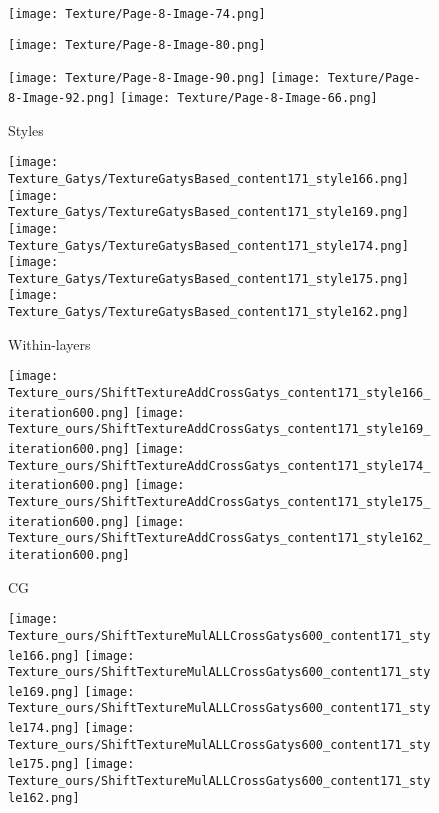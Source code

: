 \documentclass[runningheads]{llncs}
\begin{document}
\begin{figure*}[!htbp]
\centering
\small 
\begin{subfigure}[t]{0.15\textwidth}
	
	\texttt{[image: Texture/Page-8-Image-74.png]}

	\texttt{[image: Texture/Page-8-Image-80.png]}

	\texttt{[image: Texture/Page-8-Image-90.png]}
	\texttt{[image: Texture/Page-8-Image-92.png]}
    \texttt{[image: Texture/Page-8-Image-66.png]}

    \caption{Styles}
\end{subfigure}
\begin{subfigure}[t]{0.15\textwidth}
	
	\texttt{[image: Texture\_Gatys/TextureGatysBased\_content171\_style166.png]}
	\texttt{[image: Texture\_Gatys/TextureGatysBased\_content171\_style169.png]}
	\texttt{[image: Texture\_Gatys/TextureGatysBased\_content171\_style174.png]}
	\texttt{[image: Texture\_Gatys/TextureGatysBased\_content171\_style175.png]}  
    \texttt{[image: Texture\_Gatys/TextureGatysBased\_content171\_style162.png]}

    \caption{Within-layers}
\end{subfigure}

\begin{subfigure}[t]{0.15\textwidth}
	
	\texttt{[image: Texture\_ours/ShiftTextureAddCrossGatys\_content171\_style166\_iteration600.png]}
	\texttt{[image: Texture\_ours/ShiftTextureAddCrossGatys\_content171\_style169\_iteration600.png]}
	\texttt{[image: Texture\_ours/ShiftTextureAddCrossGatys\_content171\_style174\_iteration600.png]}
	\texttt{[image: Texture\_ours/ShiftTextureAddCrossGatys\_content171\_style175\_iteration600.png]}
    \texttt{[image: Texture\_ours/ShiftTextureAddCrossGatys\_content171\_style162\_iteration600.png]}
    \caption{CG}
\end{subfigure}
\begin{subfigure}[t]{0.15\textwidth}

	\texttt{[image: Texture\_ours/ShiftTextureMulALLCrossGatys600\_content171\_style166.png]}
    \texttt{[image: Texture\_ours/ShiftTextureMulALLCrossGatys600\_content171\_style169.png]}
    \texttt{[image: Texture\_ours/ShiftTextureMulALLCrossGatys600\_content171\_style174.png]}
    \texttt{[image: Texture\_ours/ShiftTextureMulALLCrossGatys600\_content171\_style175.png]}
    \texttt{[image: Texture\_ours/ShiftTextureMulALLCrossGatys600\_content171\_style162.png]}


\end{subfigure}
\end{figure*}
\end{document}
